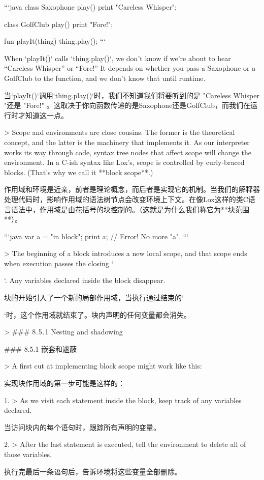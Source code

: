 \documentclass[cn,11pt,chinese]{elegantbook}
\begin{document}
{{{{{{{```java
class Saxophone {
  play() {
    print "Careless Whisper";
  }
}

class GolfClub {
  play() {
    print "Fore!";
  }
}

fun playIt(thing) {
  thing.play();
}
```

When `playIt()` calls `thing.play()`, we don’t know if we’re about to hear “Careless Whisper” or “Fore!” It depends on whether you pass a Saxophone or a GolfClub to the function, and we don’t know that until runtime.

当`playIt()`调用`thing.play()`时，我们不知道我们将要听到的是 "Careless Whisper "还是 "Fore!" 。这取决于你向函数传递的是Saxophone还是GolfClub，而我们在运行时才知道这一点。

> Scope and environments are close cousins. The former is the theoretical concept, and the latter is the machinery that implements it. As our interpreter works its way through code, syntax tree nodes that affect scope will change the environment. In a C-ish syntax like Lox’s, scope is controlled by curly-braced blocks. (That’s why we call it **block scope**.)

作用域和环境是近亲，前者是理论概念，而后者是实现它的机制。当我们的解释器处理代码时，影响作用域的语法树节点会改变环境上下文。在像Lox这样的类C语言语法中，作用域是由花括号的块控制的。（这就是为什么我们称它为**块范围**）。

```java
{
  var a = "in block";
}
print a; // Error! No more "a".
```

> The beginning of a block introduces a new local scope, and that scope ends when execution passes the closing `}`. Any variables declared inside the block disappear.

块的开始引入了一个新的局部作用域，当执行通过结束的`}`时，这个作用域就结束了。块内声明的任何变量都会消失。

> ### 8 . 5 . 1 Nesting and shadowing

### 8.5.1 嵌套和遮蔽

> A first cut at implementing block scope might work like this:

实现块作用域的第一步可能是这样的：

1. > As we visit each statement inside the block, keep track of any variables declared.

   当访问块内的每个语句时，跟踪所有声明的变量。

2. > After the last statement is executed, tell the environment to delete all of those variables.

   执行完最后一条语句后，告诉环境将这些变量全部删除。

}}}}}
\end{document}
